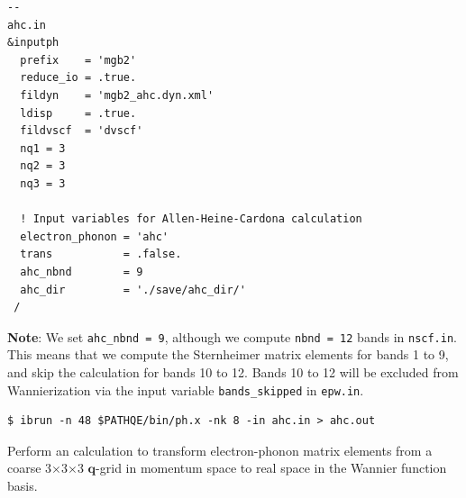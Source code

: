 \documentclass[a4paper,11pt,serif]{article}
\newcommand{\mb}[1]{\mathbf{#1}}
\begin{document}
\begin{scriptsize}
 \begin{Verbatim}[frame=single]
--                                                                                                 ahc.in
&inputph
  prefix    = 'mgb2'
  reduce_io = .true.
  fildyn    = 'mgb2_ahc.dyn.xml'
  ldisp     = .true.
  fildvscf  = 'dvscf'
  nq1 = 3
  nq2 = 3
  nq3 = 3

  ! Input variables for Allen-Heine-Cardona calculation
  electron_phonon = 'ahc'
  trans           = .false.
  ahc_nbnd        = 9
  ahc_dir         = './save/ahc_dir/'
 /
\end{Verbatim}
\end{scriptsize}

\begin{footnotesize}
   \textbf{Note}: We set \texttt{ahc\_nbnd = 9}, although we compute \texttt{nbnd = 12} bands in \texttt{nscf.in}.
   This means that we compute the Sternheimer matrix elements for bands 1 to 9, and skip the calculation for bands 10 to 12. Bands 10 to 12 will be excluded from Wannierization via the input variable \texttt{bands\_skipped} in \texttt{epw.in}.
\end{footnotesize}


\begin{verbatim}
$ ibrun -n 48 $PATHQE/bin/ph.x -nk 8 -in ahc.in > ahc.out
\end{verbatim}


\vspace{0.5cm}

\action Perform an  calculation to transform electron-phonon matrix elements from a coarse 3$\times$3$\times$3 $\mb{q}$-grid in momentum space to real space in the Wannier function basis.
\end{document}
